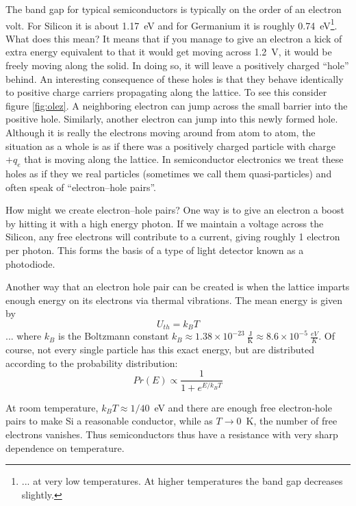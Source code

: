 \documentclass{tufte-book}
\begin{document}
The band gap for typical semiconductors is typically on the order of an electron volt. For Silicon it is about 1.17~eV and for Germanium it is roughly 0.74~eV\footnote{... at very low temperatures. At higher temperatures the band gap decreases slightly.}. What does this mean? It means that if you manage to give an electron a kick of extra energy equivalent to that it would get moving across 1.2~V, it would be freely moving along the solid. In doing so, it will leave a positively charged ``hole'' behind. An interesting consequence of these holes is that they behave identically to positive charge carriers propagating along the lattice. To see this consider figure \ref{fig:olez}. A neighboring electron can jump across the small barrier into the positive hole. Similarly, another electron can jump into this newly formed hole. Although it is really the electrons moving around from atom to atom, the situation as a whole is as if there was a positively charged particle with charge $+q_e$ that is moving along the lattice. In semiconductor electronics we treat these holes as if they we real particles (sometimes we call them quasi-particles) and often speak of ``electron--hole pairs''.

How might we create electron--hole pairs? One way is to give an electron a boost by hitting it with a high energy photon. If we maintain a voltage across the Silicon, any free electrons will contribute to a current, giving roughly 1 electron per photon. This forms the basis of a type of light detector known as a photodiode.

Another way that an electron hole pair can be created is when the lattice imparts enough energy on its electrons via thermal vibrations. The mean energy is given by 
\begin{equation}
\label{eq:thermal_energy}
U_{th} = k_BT
\end{equation}
\noindent ... where $k_B$ is the Boltzmann constant $k_B \approx 1.38\times10^{-23}~\frac{\text{J}}{\text{K}}\approx 8.6\times10^{-5}~\frac{eV}{K}$. Of course, not every single particle has this exact energy, but are distributed according to the probability distribution:
\begin{equation}
\label{eq:thermal_distn}
Pr(E) \propto \frac{1}{1+e^{E/k_BT}}
\end{equation}

\noindent At room temperature, $k_BT\approx 1/40$~eV and there are enough free electron-hole pairs to make Si a reasonable conductor, while as $T\rightarrow0$~K, the number of free electrons vanishes. Thus semiconductors thus have a resistance with very sharp dependence on temperature. 
\end{document}
